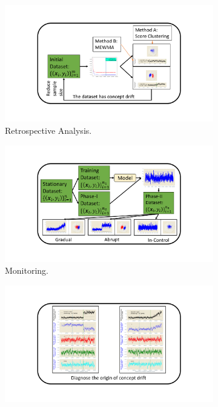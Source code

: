 \documentclass[twoside,11pt]{article}
\begin{document}
\begin{figure}[!htbp]
\centering
 \begin{subfigure}[t]{0.49\linewidth}
         \centering
         \includegraphics[width = 1\linewidth]{../figures/v14/flow_chart/Retrospective.png}
         \caption{Retrospective Analysis.}
         \label{fig:retro_analysis}
  \end{subfigure}
  \begin{subfigure}[t]{0.49\linewidth}
         \centering
         \includegraphics[width = 1\linewidth]{../figures/v14/flow_chart/Monitoring.png}
         \caption{Monitoring.}
         \label{fig:Monitoring}
  \end{subfigure}
  \begin{subfigure}[t]{0.49\linewidth}
         \centering
         \includegraphics[width = 1\linewidth]{../figures/v14/flow_chart/Diagnose.png}

\end{subfigure}
\end{figure}
\end{document}
